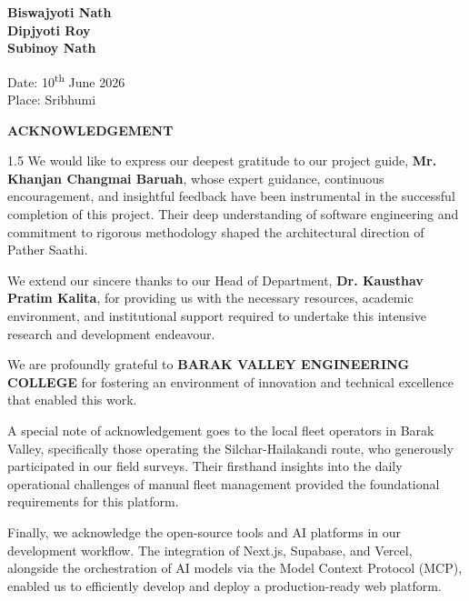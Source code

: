 \documentclass[12pt, a4paper, oneside]{report}
\begin{document}
\vspace{3cm}

\begin{flushright}
    \textbf{Biswajyoti Nath}\\
    \vspace{1cm}
    \textbf{Dipjyoti Roy}\\
    \vspace{1cm}
    \textbf{Subinoy Nath}
\end{flushright}

\vspace{1.5cm}
\noindent Date: 10\textsuperscript{th} June 2026\\
Place: Sribhumi

\newpage
\thispagestyle{empty}
\begin{center}
    {\Huge \textbf{ACKNOWLEDGEMENT}}\par
    \vspace{1.5cm}
\end{center}

\begin{spacing}{1.5}
We would like to express our deepest gratitude to our project guide, \textbf{Mr. Khanjan Changmai Baruah}, whose expert guidance, continuous encouragement, and insightful feedback have been instrumental in the successful completion of this project. Their deep understanding of software engineering and commitment to rigorous methodology shaped the architectural direction of Pather Saathi.

We extend our sincere thanks to our Head of Department, \textbf{Dr. Kausthav Pratim Kalita}, for providing us with the necessary resources, academic environment, and institutional support required to undertake this intensive research and development endeavour.

We are profoundly grateful to \textbf{BARAK VALLEY ENGINEERING COLLEGE} for fostering an environment of innovation and technical excellence that enabled this work.

A special note of acknowledgement goes to the local fleet operators in Barak Valley, specifically those operating the Silchar-Hailakandi route, who generously participated in our field surveys. Their firsthand insights into the daily operational challenges of manual fleet management provided the foundational requirements for this platform.

Finally, we acknowledge the open-source tools and AI platforms in our development workflow. The integration of Next.js, Supabase, and Vercel, alongside the orchestration of AI models via the Model Context Protocol (MCP), enabled us to efficiently develop and deploy a production-ready web platform.
\end{spacing}
\end{document}
